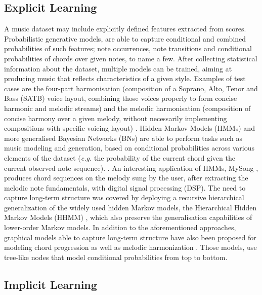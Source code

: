         \subsection{Explicit Learning}
        A music dataset may include explicitly defined features extracted from scores. Probabilistic generative models, are able to capture conditional and combined probabilities of such features; note occurrences, note transitions and conditional probabilities of chords over given notes, to name a few. After collecting statistical information about the dataset, multiple models can be trained, aiming at producing music that reflects characteristics of a given style. Examples of test cases are the four-part harmonisation (composition of a Soprano, Alto, Tenor and Bass (SATB) voice layout, combining those voices properly to form concise harmonic and melodic streams) \cite{allan2005harmonising,suzuki2013four} and the melodic harmonisation (composition of concise harmony over a given melody, without necessarily implementing compositions with specific voicing layout) \cite{simon2008mysong,raczynski2013melody}. Hidden Markov Models (HMMs) \cite{allan2005harmonising, simon2008mysong,raczynski2013melody} and more generalised Bayesian Networks (BNs) \cite{suzuki2013four} are able to perform tasks such as music modeling and generation, based on conditional probabilities across various elements of the dataset (\textit{e.g.} the probability of the current chord given the current observed note sequence).  \cite{maxim_kal_pap_book}. An interesting application of HMMs, MySong \cite{simon2008mysong}, produces chord sequences on the melody sung by the user, after extracting the melodic note fundamentals, with digital signal processing (DSP). The need to capture long-term structure was covered by deploying a recursive hierarchical generalization of the widely used hidden Markov models, the Hierarchical Hidden Markov Models (HHMM) \cite{thornton2009hierarchical}, which also preserve the generalisation capabilities of lower-order Markov models. In addition to the aforementioned approaches, graphical models able to capture long-term structure have also been proposed for modeling chord progression \cite{paiement2005probabilistic} as well as melodic harmonization \cite{paiement2006probabilistic}. Those models, use tree-like nodes that model conditional probabilities from top to bottom. 
        
              
        \subsection{Implicit Learning}
        
